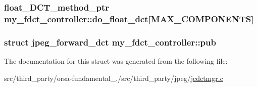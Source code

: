 \subsubsection[{do\+\_\+float\+\_\+dct}]{\setlength{\rightskip}{0pt plus 5cm}float\+\_\+\+D\+C\+T\+\_\+method\+\_\+ptr my\+\_\+fdct\+\_\+controller\+::do\+\_\+float\+\_\+dct\mbox{[}{\bf M\+A\+X\+\_\+\+C\+O\+M\+P\+O\+N\+E\+N\+T\+S}\mbox{]}}\label{structmy__fdct__controller_acaf7fa6e7d2647b35436654eb02d9bb3}
\hypertarget{structmy__fdct__controller_a233a1343c6fc838dcad3d3dce3a658a0}{}
\subsubsection[{pub}]{\setlength{\rightskip}{0pt plus 5cm}struct {\bf jpeg\+\_\+forward\+\_\+dct} my\+\_\+fdct\+\_\+controller\+::pub}\label{structmy__fdct__controller_a233a1343c6fc838dcad3d3dce3a658a0}


The documentation for this struct was generated from the following file\+:\begin{DoxyCompactItemize}
\item 
src/third\+\_\+party/orsa-\/fundamental\+\_./src/third\+\_\+party/jpeg/\hyperlink{jcdctmgr_8c}{jcdctmgr.\+c}\end{DoxyCompactItemize}
